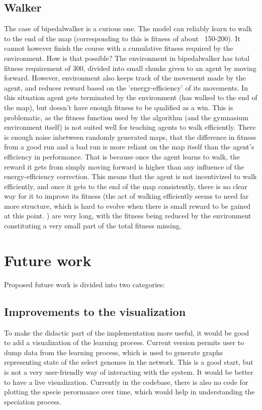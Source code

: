 \documentclass{article}
\begin{document}
\subsection{Walker}
    The case of bipedalwalker is a curious one. The model can reliably learn to walk to the end of the map (corresponding
    to this is fitness of about ~150-200). It cannot however finish the course with a cumulative fitness required by the
    environment. How is that possible? The environment in bipedalwalker has total fitness requirement of 300, divided
    into small chunks given to an agent by moving forward. However, environment also keeps track of the movement made
    by the agent, and reduces reward based on the 'energy-efficiency' of its movements. In this situation agent 
    gets terminated by the environment (has walked to the end of the map), but doesn't have enough fitness to be 
    qualified as a win. 
    This is problematic, as the fitness function used by the algorithm (and the gymnasium environment
    itself) is not suited well for teaching agents to walk efficiently. There is enough noise inbetween
    randomly generated maps, that the difference in fitness from a good run and a bad run is more reliant
    on the map itself than the agent's efficiency in performance.
     That is because once the agent learns to walk, the reward it gets from simply moving forward is higher than any influence
     of the energy-efficiency correction. This means that the agent is not incentivized to walk efficiently, and
     once it gets to the end of the map consistently, there is no clear way for it to improve its fitness (the 
     act of walking efficiently seems to need far more structure, which is hard to evolve when there is small 
     reward to be gained at this point.
      )
    are very long, with the fitness being reduced by the environment constituting a very small part of the total fitness missing.
\section{Future work}
    Proposed future work is divided into two categories: 
        \subsection{Improvements to the visualization} 
        To make the didactic part of the implementation more useful, it would be good to add a visualization of the
        learning process. Current version permits user to dump data from the learning process, which is used to
        generate graphs representing state of the select genomes in the network. This is a good start, but is not
        a very user-friendly way of interacting with the system. It would be better to have a live visualization.
        Currently in the codebase, there is also no code for plotting the specie perormance over time, which would
        help in understanding the speciation process.
\end{document}
